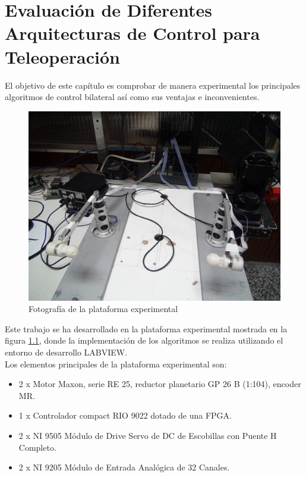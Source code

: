 
\graphicspath{{./FiguresA/}}
\chapter{Evaluación de Diferentes Arquitecturas de Control para Teleoperación}
\label{ch:arquitecturas}
El objetivo de este capítulo es comprobar de manera experimental los principales algoritmos de control bilateral así como sus ventajas e inconvenientes.

\begin{figure}[htbp]
\centering
	\includegraphics[scale=0.2]{setup.jpg}
	\caption{Fotografía de la plataforma experimental}
  	\label{fig:setup}
\end{figure}
Este trabajo se ha desarrollado en la plataforma experimental mostrada en la figura \ref{fig:setup}, donde la implementación de los algoritmos se realiza utilizando el entorno de desarrollo LABVIEW.\\
Los elementos principales de la plataforma experimental son:
\begin{itemize}
\item 2 x Motor Maxon, serie RE 25, reductor planetario GP 26 B (1:104), encoder MR.
\item 1 x Controlador compact RIO 9022 dotado de una FPGA.
\item 2 x NI 9505 Módulo de Drive Servo de DC de Escobillas con Puente H Completo.
\item 2 x NI 9205 Módulo de Entrada Analógica de 32 Canales.
\end{itemize}

